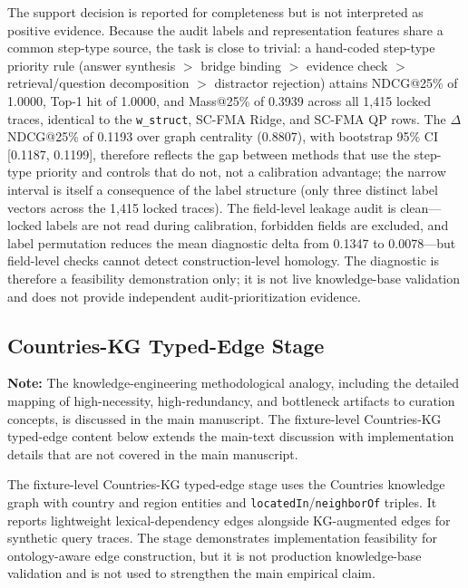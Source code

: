 \documentclass[a4paper,fleqn]{cas-sc}
\begin{document}
The support decision is reported for completeness but is not interpreted as positive evidence. Because the audit labels and representation features share a common step-type source, the task is close to trivial: a hand-coded step-type priority rule (answer synthesis $>$ bridge binding $>$ evidence check $>$ retrieval/question decomposition $>$ distractor rejection) attains NDCG@25\% of 1.0000, Top-1 hit of 1.0000, and Mass@25\% of 0.3939 across all 1,415 locked traces, identical to the \texttt{w\_struct}, SC-FMA Ridge, and SC-FMA QP rows. The $\Delta$NDCG@25\% of 0.1193 over graph centrality (0.8807), with bootstrap 95\% CI [0.1187, 0.1199], therefore reflects the gap between methods that use the step-type priority and controls that do not, not a calibration advantage; the narrow interval is itself a consequence of the label structure (only three distinct label vectors across the 1,415 locked traces). The field-level leakage audit is clean---locked labels are not read during calibration, forbidden fields are excluded, and label permutation reduces the mean diagnostic delta from 0.1347 to 0.0078---but field-level checks cannot detect construction-level homology. The diagnostic is therefore a feasibility demonstration only; it is not live knowledge-base validation and does not provide independent audit-prioritization evidence.

\subsection{Countries-KG Typed-Edge Stage}
\label{app:kg-representation-stage}

\noindent\textbf{Note:} The knowledge-engineering methodological analogy, including the detailed mapping of high-necessity, high-redundancy, and bottleneck artifacts to curation concepts, is discussed in the main manuscript. The fixture-level Countries-KG typed-edge content below extends the main-text discussion with implementation details that are not covered in the main manuscript.

The fixture-level Countries-KG typed-edge stage uses the Countries knowledge graph with country and region entities and \texttt{locatedIn}/\texttt{neighborOf} triples. It reports lightweight lexical-dependency edges alongside KG-augmented edges for synthetic query traces. The stage demonstrates implementation feasibility for ontology-aware edge construction, but it is not production knowledge-base validation and is not used to strengthen the main empirical claim.
\end{document}
